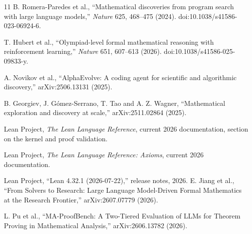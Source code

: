 \documentclass[11pt]{article}
\begin{document}
\begin{thebibliography}{11}
B. Romera-Paredes et al., ``Mathematical discoveries from program search with large language models,'' \emph{Nature} 625, 468--475 (2024). doi:10.1038/s41586-023-06924-6.

T. Hubert et al., ``Olympiad-level formal mathematical reasoning with reinforcement learning,'' \emph{Nature} 651, 607--613 (2026). doi:10.1038/s41586-025-09833-y.

A. Novikov et al., ``AlphaEvolve: A coding agent for scientific and algorithmic discovery,'' arXiv:2506.13131 (2025).

B. Georgiev, J. G\'omez-Serrano, T. Tao and A. Z. Wagner, ``Mathematical exploration and discovery at scale,'' arXiv:2511.02864 (2025).

Lean Project, \emph{The Lean Language Reference}, current 2026 documentation, section on the kernel and proof validation.

Lean Project, \emph{The Lean Language Reference: Axioms}, current 2026 documentation.

Lean Project, ``Lean 4.32.1 (2026-07-22),'' release notes, 2026.
E. Jiang et al., ``From Solvers to Research: Large Language Model-Driven Formal Mathematics at the Research Frontier,'' arXiv:2607.07779 (2026).

L. Pu et al., ``MA-ProofBench: A Two-Tiered Evaluation of LLMs for Theorem Proving in Mathematical Analysis,'' arXiv:2606.13782 (2026).

\end{thebibliography}
\end{document}

